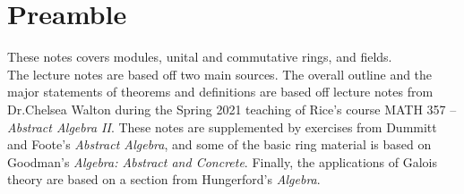 \documentclass{memoir}
\begin{document}


\chapter{Preamble}
\label{cha:preamble}

These notes covers modules, unital and commutative rings, and fields.\\

The lecture notes are based off two main sources. The overall outline and the major statements of theorems and definitions are based off lecture notes from Dr.\@ Chelsea Walton during the Spring 2021 teaching of Rice's course MATH 357 -- \textit{Abstract Algebra II}. These notes are supplemented by exercises from Dummitt and Foote's \textit{Abstract Algebra}, and some of the basic ring material is based on Goodman's \textit{Algebra: Abstract and Concrete}. Finally, the applications of Galois theory are based on a section from Hungerford's \textit{Algebra}.
\end{document}
